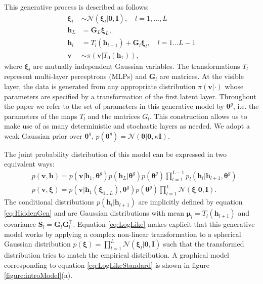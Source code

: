 \documentclass{article}
\newcommand{\hid}{\ensuremath{\mathbf{h}}} %
\newcommand{\vis}{\ensuremath{\mathbf{v}}} %
\newcommand{\N}{\mathcal{N}} %
\newcommand{\myvec}[1]{\mbox{$\mathbf{#1}$}}
\newcommand{\myvecsym}[1]{\mbox{$\boldsymbol{#1}$}}
\newcommand{\vzero}{\mbox{$\myvecsym{0}$}}
\newcommand{\vmu}{\mbox{$\myvecsym{\mu}$}}
\newcommand{\vtheta}{\mbox{$\myvecsym{\theta}$}}
\newcommand{\vxi}{\mbox{$\myvecsym{\xi}$}}
\newcommand{\vG}{\mbox{$\myvec{G}$}}
\newcommand{\vI}{\mbox{$\myvec{I}$}}
\newcommand{\vS}{\mbox{$\myvec{S}$}}
\begin{document}
\begin{bibunit}[icml2013]
This generative process is described as follows:
\vspace{-2mm}
\begin{align}
\vxi_l & \sim \N(\vxi_l | \vzero, \vI), \quad l = 1, \ldots, L \\
\hid_{L} &= \vG_{L} \vxi_{L}, \label{eq:xL} \\
\hid_{l} &= T_l(\hid_{l+1}) + \vG_{l} \vxi_{l}, \quad l =1 \ldots L-1 
\label{eq:HiddenGen} \\
\vis & \sim  \pi(\vis | T_0(\hid_{1})),
\label{eq:Visible}
\end{align}
where $\vxi_l$ are mutually independent Gaussian variables. The 
transformations $T_l$ represent multi-layer perceptrons (MLPs) and 
$\vG_l$ are matrices. At the visible layer, the data is generated from any 
appropriate distribution $\pi(\vis | 
\cdot)$ whose parameters are specified by a transformation of the first 
latent layer. 
Throughout the paper we refer 
to the set of parameters in  this generative model  by $\vtheta^g$, i.e. the parameters of the maps $T_l$ and the matrices $G_l$. This 
construction allows us to make use of as many deterministic and stochastic 
layers as needed.
We adopt a 
weak Gaussian prior over $\vtheta^g$, $p(\vtheta^g) = \N(\vtheta| \vzero, 
\kappa\vI)$.

The joint probability distribution of this model can be expressed in two equivalent ways:
\begin{align}
& p(\vis,\! \hid)\! =\! p(\!\vis| \hid_1, \!\vtheta^g ) p(\hid_L | \vtheta^g) 
p(\!\vtheta^g\!)
\!\!\prod_{l=1}^{L 
- 1}\!\! p_l( \hid_l | \hid_{l\!+\!1}, \!\vtheta^g )\label{eq:LogLikeStandard} 
\\
& p(\vis,\!\vxi)\! = p(\vis| \hid_1( \vxi_{1 \ldots L} ), \vtheta^g ) 
p(\vtheta^g) 
\prod_{l=1}^{L} 
 \N(\vxi| \vzero, \vI). \label{eq:LogLike}
\end{align}
The conditional distributions $p( \hid_l | \hid_{l+1} )$ are implicitly 
defined by equation \eqref{eq:HiddenGen} and are Gaussian distributions 
with mean $\vmu_l = T_l(\hid_{l+1})$ and covariance $\vS_l = \vG_l 
\vG_l^\top$. Equation \eqref{eq:LogLike} makes explicit that this 
generative model works by applying a complex non-linear transformation to 
a spherical Gaussian distribution $p(\vxi) = \prod_{l=1}^{L} 
\N(\vxi_l| \vzero, \vI)$ such that the transformed 
distribution tries to match the empirical distribution. A graphical model 
corresponding to equation \eqref{eq:LogLikeStandard} is shown in figure
\ref{figure:introModel}(a). 


\end{bibunit}
\end{document}
